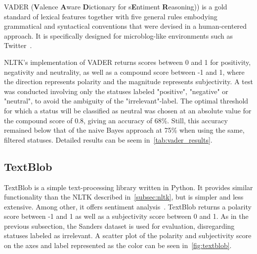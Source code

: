 VADER (\textbf{V}alence \textbf{A}ware \textbf{D}ictionary for s\textbf{E}ntiment \textbf{R}easoning))
is a gold standard of lexical features together with five general rules embodying grammatical and syntactical conventions
that were devised in a human-centered approach.
It is specifically designed for microblog-like environments such as Twitter~\cite{Hutto2014}.
\par
NLTK's implementation of VADER returns scores between 0 and 1 for positivity, negativity and neutrality,
as well as a compound score between -1 and 1, where the direction represents polarity and the magnitude represents subjectivity.
A test was conducted involving only the statuses labeled "positive", "negative" or "neutral",
to avoid the ambiguity of the "irrelevant"-label.
The optimal threshold for which a status will be classified as neutral was chosen
at an absolute value for the compound score of 0.8, giving an accuracy of 68\%.
Still, this accuracy remained below that of the naive Bayes approach at 75\% when using the same, filtered statuses.
Detailed results can be seem in~\ref{tab:vader_results}.

\begin{table}
    \caption{Sentiment classification using VADER}
    \label{tab:vader_results}
\end{table}

\subsection{TextBlob}
\label{subsec:textblob}

TextBlob is a simple text-processing library written in Python.
It provides similar functionality than the NLTK described in~\ref{subsec:nltk},
but is simpler and less extensive.
Among other, it offers sentiment analysis~\cite{textblobDocs}.
TextBlob returns a polarity score between -1 and 1 as well as a subjectivity score between 0 and 1.
As in the previous subsection, the Sanders dataset is used for evaluation, disregarding statuses labeled as irrelevant.
A scatter plot of the polarity and subjectivity score on the axes and label represented as the color can be seen in~\ref{fig:textblob}.


